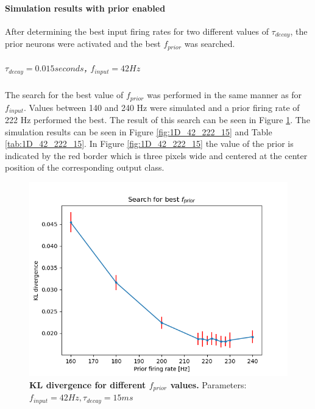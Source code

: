 \paragraph{Simulation results with prior enabled}
After determining the best input firing rates for two different values of $\tau_{decay}$, the prior neurons were activated and the best $f_{prior}$ was searched.
\subparagraph{$\tau_{decay} = 0.015 seconds$, $f_{input} = 42 Hz$}
The search for the best value of $f_{prior}$ was performed in the same manner as for $f_{input}$. Values between 140 and 240 Hz were simulated and a prior firing rate of 222 Hz performed the best. The result of this search can be seen in Figure \ref{fig:1D_KLD_fInput42_tau15}. The simulation results can be seen in Figure \ref{fig:1D_42_222_15} and Table \ref{tab:1D_42_222_15}. In Figure \ref{fig:1D_42_222_15} the value of the prior is indicated by the red border which is three pixels wide and centered at the center position of the corresponding output class.

\begin{figure}
  \includegraphics[width=\linewidth]{figures/1D/KLDvsfPrior_fInput42tau15.png}
  \caption{\textbf{KL divergence for different $f_{prior}$ values.} Parameters: $f_{input} = 42 Hz, \tau_{decay} = 15 ms$}
  \label{fig:1D_KLD_fInput42_tau15}
\end{figure}

